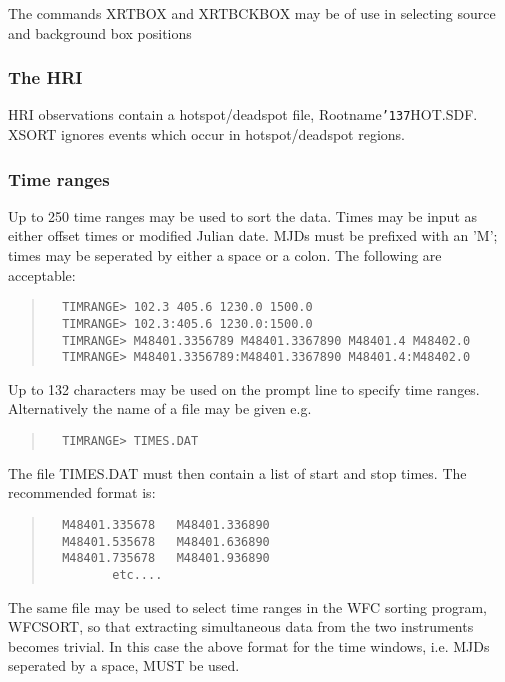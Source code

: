 \documentclass{book}
\renewcommand{\_}{{\tt\char'137}}     %
\begin{document}
The commands XRTBOX and XRTBCKBOX may be of use in selecting source and
background box positions
 
\subsubsection{The HRI}
HRI observations contain a hotspot/deadspot file, Rootname\_HOT.SDF.
XSORT ignores events which occur in hotspot/deadspot regions.
 
\subsubsection{Time ranges}
Up to 250 time ranges may be used to sort the data. Times may be input
as either offset times or modified Julian date. MJDs must be prefixed
with an 'M'; times may be seperated by either a space or a colon.
The following are acceptable:
 
\begin{quote}\begin{verbatim}
  TIMRANGE> 102.3 405.6 1230.0 1500.0
  TIMRANGE> 102.3:405.6 1230.0:1500.0
  TIMRANGE> M48401.3356789 M48401.3367890 M48401.4 M48402.0
  TIMRANGE> M48401.3356789:M48401.3367890 M48401.4:M48402.0
\end{verbatim}\end{quote}
Up to 132 characters may be used on the prompt line to specify time
ranges. Alternatively the name of a file may be given e.g.
\begin{quote}\begin{verbatim}
  TIMRANGE> TIMES.DAT
\end{verbatim}\end{quote}
The file TIMES.DAT must then contain a list of start and stop times.
The recommended format is:
\begin{quote}\begin{verbatim}
  M48401.335678   M48401.336890
  M48401.535678   M48401.636890
  M48401.735678   M48401.936890
         etc....
\end{verbatim}\end{quote}
The same file may be used to select time ranges in the WFC sorting
program, WFCSORT, so that extracting simultaneous data from the
two instruments becomes trivial. In this case the above format for
the time windows, i.e. MJDs seperated by a space, MUST be used.
 
\end{document}

